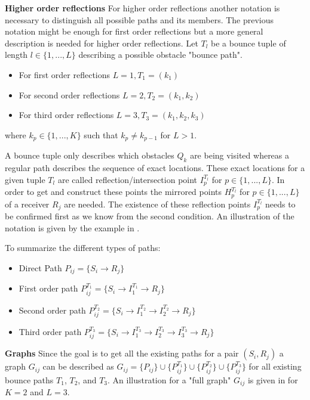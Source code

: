 \textbf{Higher order reflections}\newline
For higher order reflections another notation is necessary to distinguish all possible paths and its members.
The previous notation might be enough for first order reflections but a more general description is needed for higher order reflections.
Let $T_l$ be a bounce tuple of length $l \in \{1,...,L\}$ describing a possible obstacle "bounce path".

\begin{itemize}
    \item For first order reflections $L = 1, T_1 = (k_1)$
    \item For second order reflections $L = 2, T_2 = (k_1, k_2)$
    \item For third order reflections $L = 3, T_3 = (k_1, k_2, k_3)$
\end{itemize}
where $k_p \in \{1,...,K\}$ such that $k_{p} \neq k_{p-1}$ for $L > 1$.

A bounce tuple only describes which obstacles $Q_k$ are being visited whereas a regular path describes the sequence of exact locations.
These exact locations for a given tuple $T_l$ are called reflection/intersection point $I_p^{T_l}$ for $p \in \{1,...,L\}$.
In order to get and construct these points the mirrored points $H_p^{T_l}$ for $p \in \{1,...,L\}$ of a receiver $R_j$ are needed.
The existence of these reflection points $I_p^{T_l}$ needs to be confirmed first as we know from the second condition.
An illustration of the notation is given by the example in .


To summarize the different types of paths:
\begin{itemize}
    \item Direct Path $P_{ij} = \{ S_i \rightarrow R_j \}$
    \item First order path $P_{ij}^{T_1} = \{ S_i \rightarrow I_1^{T_1} \rightarrow R_j \}$
    \item Second order path $P_{ij}^{T_2} = \{ S_i \rightarrow I_1^{T_2} \rightarrow I_2^{T_2}\rightarrow R_j \}$
    \item Third order path $P_{ij}^{T_3} = \{ S_i \rightarrow I_1^{T_3} \rightarrow I_2^{T_3} \rightarrow I_3^{T_3} \rightarrow R_j \}$
\end{itemize}

\textbf{Graphs}\newline
Since the goal is to get all the existing paths for a pair $(S_i, R_j)$ a graph $G_{ij}$ can be described as $G_{ij} = \{P_{ij}\} \cup \{P_{ij}^{T_1}\} \cup \{P_{ij}^{T_2}\} \cup \{P_{ij}^{T_3}\}$ for all existing bounce paths $T_1$, $T_2$, and $T_3$.
An illustration for a "full graph" $G_{ij}$ is given in  for $K=2$ and $L=3$.


